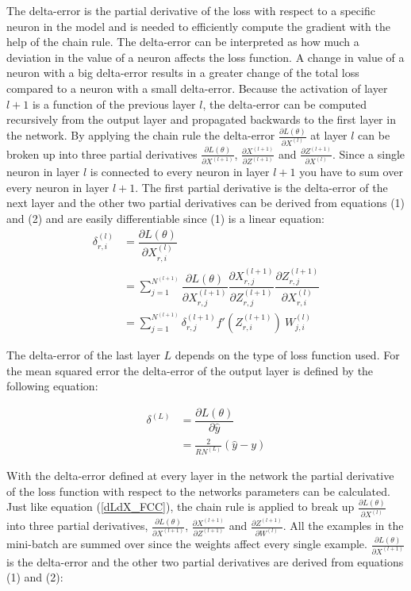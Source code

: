\documentclass[a4paper, twoside]{article}
\newcommand*{\pd}[2]{\ensuremath{\dfrac{\partial #1}{\partial #2}}}
\newcommand*{\inpd}[2]{\ensuremath{\frac{\partial #1}{\partial #2}}}
\begin{document}
The delta-error is the partial derivative of the loss with respect to a specific neuron in the model and is needed to efficiently compute the gradient with the help of the chain rule. The delta-error can be interpreted as how much a deviation in the value of a neuron affects the loss function. A change in value of a neuron with a big delta-error results in a greater change of the total loss compared to a neuron with a small delta-error. Because the activation of layer $l+1$ is a function of the previous layer $l$, the delta-error can be computed recursively from the output layer and propagated backwards to the first layer in the network. By applying the chain rule the delta-error $\inpd{L(\theta)}{X^{(l)}}$  at layer $l$ can be broken up into three partial derivatives $\inpd{L(\theta)}{X^{(l+1)}}$, $\inpd{X^{(l+1)}}{Z^{(l+1)}}$ and $\inpd{Z^{(l+1)}}{X^{(l)}}$. Since a single neuron in layer $l$ is connected to every neuron in layer $l+1$ you have to sum over every neuron in layer $l+1$. The first partial derivative is the delta-error of the next layer and the other two partial derivatives can be derived from equations (1) and (2) and are easily differentiable since (1) is a linear equation: \cite{cs231n} \cite{wikiStanford}
\begin{equation}\label{dLdX_FCC}
\begin{split}
\delta^{(l)}_{r,i}
	& = \pd{L(\theta)}{X^{(l)}_{r,i}}  \\
	& = \sum^{N^{(l+1)}}_{j=1} \pd{L(\theta)}{X^{(l+1)}_{r,j}} \pd{X^{(l+1)}_{r,j}}{Z^{(l+1)}_{r,j}} \pd{Z^{(l+1)}_{r,j}}{X^{(l)}_{r,i}} \\
	& = \sum^{N^{(l+1)}}_{j=1} \delta^{(l+1)}_{r,j} f'(Z^{(l+1)}_{r,i}) \ W^{(l)}_{j,i} 
\end{split}
\end{equation}

The delta-error of the last layer $L$ depends on the type of loss function used. For the mean squared error the delta-error of the output layer is defined by the following equation: \cite{cs231n} \cite{wikiStanford}

\begin{equation}\label{MSEdelta}
\begin{split}
\delta^{(L)}
	& = \pd{L(\theta)}{\hat{y}}  \\
	& = \frac{2}{RN^{(L)}} (\hat{y}-y)
\end{split}
\end{equation}

With the delta-error defined at every layer in the network the partial derivative of the loss function with respect to the networks parameters can be calculated. Just like equation (\ref{dLdX_FCC}), the chain rule is applied to break up $\inpd{L(\theta)}{X^{(l)}}$ into three partial derivatives, $\inpd{L(\theta)}{X^{(l+1)}}$, $\inpd{X^{(l+1)}}{Z^{(l+1)}}$ and $\inpd{Z^{(l+1)}}{W^{(l)}}$. All the examples in the mini-batch are summed over since the weights affect every single example. $\inpd{L(\theta)}{X^{(l+1)}}$ is the delta-error and the other two partial derivatives are derived from equations (1) and (2): \cite{cs231n} \cite{wikiStanford}
\end{document}

